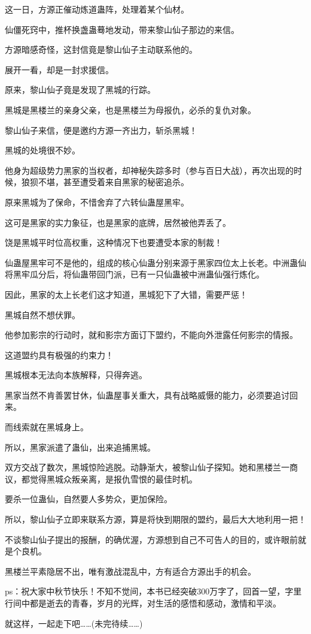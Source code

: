 \begin{this_body}
这一日，方源正催动炼道蛊阵，处理着某个仙材。

仙僵死窍中，推杯换盏蛊蓦地发动，带来黎山仙子那边的来信。

方源暗感奇怪，这封信竟是黎山仙子主动联系他的。

展开一看，却是一封求援信。

原来，黎山仙子竟是发现了黑城的行踪。

黑城是黑楼兰的亲身父亲，也是黑楼兰为母报仇，必杀的复仇对象。

黎山仙子来信，便是邀约方源一齐出力，斩杀黑城！

黑城的处境很不妙。

他身为超级势力黑家的当权者，却神秘失踪多时（参与百日大战），再次出现的时候，狼狈不堪，甚至遭受着来自黑家的秘密追杀。

原来黑城为了保命，不惜舍弃了六转仙蛊屋黑牢。

这可是黑家的实力象征，也是黑家的底牌，居然被他弄丢了。

饶是黑城平时位高权重，这种情况下也要遭受本家的制裁！

仙蛊屋黑牢可不是他的，组成的核心仙蛊分别来源于黑家四位太上长老。中洲蛊仙将黑牢瓜分后，将仙蛊带回门派，已有一只仙蛊被中洲蛊仙强行炼化。

因此，黑家的太上长老们这才知道，黑城犯下了大错，需要严惩！

黑城自然不想伏罪。

他参加影宗的行动时，就和影宗方面订下盟约，不能向外泄露任何影宗的情报。

这道盟约具有极强的约束力！

黑城根本无法向本族解释，只得奔逃。

黑家当然不肯善罢甘休，仙蛊屋事关重大，具有战略威慑的能力，必须要追讨回来。

而线索就在黑城身上。

所以，黑家派遣了蛊仙，出来追捕黑城。

双方交战了数次，黑城惊险逃脱。动静渐大，被黎山仙子探知。她和黑楼兰一商议，都觉得黑城众叛亲离，是报仇雪恨的最佳时机。

要杀一位蛊仙，自然要人多势众，更加保险。

所以，黎山仙子立即来联系方源，算是将快到期限的盟约，最后大大地利用一把！

不谈黎山仙子提出的报酬，的确优渥，方源想到自己不可告人的目的，或许眼前就是个良机。

黑楼兰平素隐居不出，唯有激战混乱中，方有适合方源出手的机会。

ps：祝大家中秋节快乐！不知不觉间，本书已经突破300万字了，回首一望，字里行间中都是逝去的青春，岁月的光辉，对生活的感悟和感动，激情和平淡。

就这样，一起走下吧……(未完待续……)

\end{this_body}

